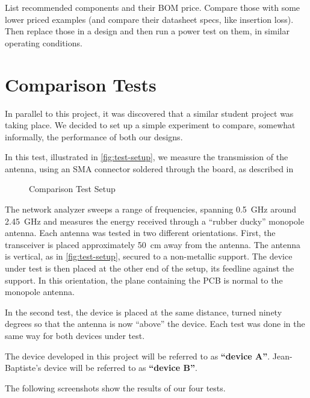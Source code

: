 List recommended components and their BOM price. Compare those with some lower
priced examples (and compare their datasheet specs, like insertion loss). Then
replace those in a design and then run a power test on them, in similar
operating conditions.




\section{Comparison Tests}

In parallel to this project, it was discovered that a similar student project
was taking place. We decided to set up a simple experiment to compare, somewhat
informally, the performance of both our designs.

In this test, illustrated in \autoref{fig:test-setup}, we measure the
transmission of the antenna, using an SMA connector soldered through the board,
as described in %

\begin{figure}[htb]
  \begin{center}
  \end{center}
  \caption{Comparison Test Setup}
  \label{fig:test-setup}
\end{figure}

The network analyzer sweeps a range of frequencies, spanning \SI{0.5}{GHz}
around \SI{2.45}{GHz} and measures the energy received through a ``rubber
ducky'' monopole antenna. Each antenna was tested in two different orientations.
First, the transceiver is placed approximately \SI{50}{cm} away from the
antenna. The antenna is vertical, as in \autoref{fig:test-setup}, secured to
a non-metallic support. The device under test is then placed at the other end of
the setup, its feedline against the support. In this orientation, the plane
containing the PCB is normal to the monopole antenna.

In the second test, the device is placed at the same distance, turned
ninety degrees so
that the antenna is now ``above'' the device. Each test was done in the same way
for both devices under test.

The device developed in this project will be referred to as \textbf{``device A''}.
Jean-Baptiste's device will be referred to as \textbf{``device B''}.


The following screenshots show the results of our four tests.

